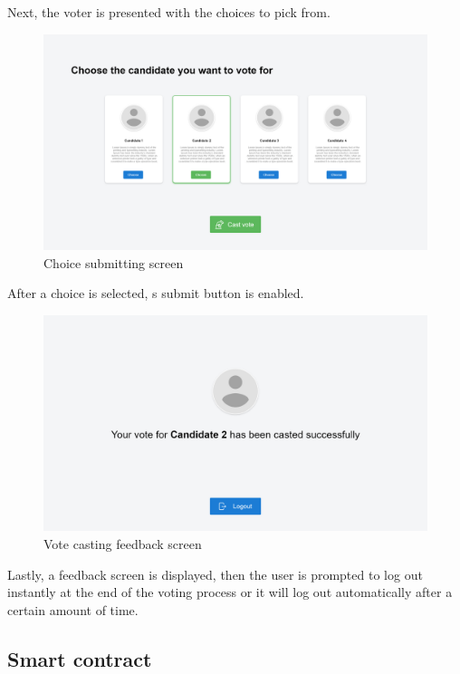 Next, the voter is presented with the choices to pick from.

\begin{figure}[H]
	\centering
		\includegraphics[width=14cm]{images/chapter3/voter_4.png}
		\caption{{\footnotesize Choice submitting screen}}
\end{figure}

After a choice is selected, s submit button is enabled.

\begin{figure}[H]
	\centering
		\includegraphics[width=14cm]{images/chapter3/voter_5.png}
		\caption{{\footnotesize Vote casting feedback screen}}
\end{figure}

Lastly, a feedback screen is displayed, then the user is prompted to log out instantly at the end of the voting process or it will log out automatically after a certain amount of time.

\subsection{Smart contract}

